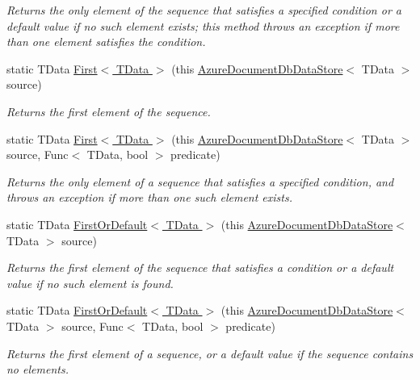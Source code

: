 \begin{DoxyCompactItemize}
\begin{DoxyCompactList}\small\item\em Returns the only element of the sequence that satisfies a specified condition or a default value if no such element exists; this method throws an exception if more than one element satisfies the condition. \end{DoxyCompactList}\item 
static T\+Data \hyperlink{classSystem_1_1Linq_1_1AzureDocumentDbDataStoreExtensions_af216b6d4045dc5bb33fc0c4c36b7a67e_af216b6d4045dc5bb33fc0c4c36b7a67e}{First$<$ T\+Data $>$} (this \hyperlink{classCqrs_1_1Azure_1_1DocumentDb_1_1DataStores_1_1AzureDocumentDbDataStore}{Azure\+Document\+Db\+Data\+Store}$<$ T\+Data $>$ source)
\begin{DoxyCompactList}\small\item\em Returns the first element of the sequence. \end{DoxyCompactList}\item 
static T\+Data \hyperlink{classSystem_1_1Linq_1_1AzureDocumentDbDataStoreExtensions_aa9bf7da64ecd097ff4270abc3592b56e_aa9bf7da64ecd097ff4270abc3592b56e}{First$<$ T\+Data $>$} (this \hyperlink{classCqrs_1_1Azure_1_1DocumentDb_1_1DataStores_1_1AzureDocumentDbDataStore}{Azure\+Document\+Db\+Data\+Store}$<$ T\+Data $>$ source, Func$<$ T\+Data, bool $>$ predicate)
\begin{DoxyCompactList}\small\item\em Returns the only element of a sequence that satisfies a specified condition, and throws an exception if more than one such element exists. \end{DoxyCompactList}\item 
static T\+Data \hyperlink{classSystem_1_1Linq_1_1AzureDocumentDbDataStoreExtensions_a5508e54e8c57884a4d220f6943dd356d_a5508e54e8c57884a4d220f6943dd356d}{First\+Or\+Default$<$ T\+Data $>$} (this \hyperlink{classCqrs_1_1Azure_1_1DocumentDb_1_1DataStores_1_1AzureDocumentDbDataStore}{Azure\+Document\+Db\+Data\+Store}$<$ T\+Data $>$ source)
\begin{DoxyCompactList}\small\item\em Returns the first element of the sequence that satisfies a condition or a default value if no such element is found. \end{DoxyCompactList}\item 
static T\+Data \hyperlink{classSystem_1_1Linq_1_1AzureDocumentDbDataStoreExtensions_ae3870009eab2cb1bf22b447d9fa51ec8_ae3870009eab2cb1bf22b447d9fa51ec8}{First\+Or\+Default$<$ T\+Data $>$} (this \hyperlink{classCqrs_1_1Azure_1_1DocumentDb_1_1DataStores_1_1AzureDocumentDbDataStore}{Azure\+Document\+Db\+Data\+Store}$<$ T\+Data $>$ source, Func$<$ T\+Data, bool $>$ predicate)
\begin{DoxyCompactList}\small\item\em Returns the first element of a sequence, or a default value if the sequence contains no elements. \end{DoxyCompactList}\end{DoxyCompactItemize}


